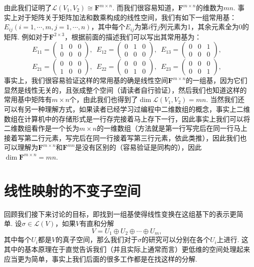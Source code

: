 由此我们证明了$\mathcal{L}(V_1,V_2)\cong\mathbf{F}^{m\times n}$. 而我们很容易知道，$\mathbf{F}^{m\times n}$的维数为$mn$. 事实上对于矩阵关于矩阵加法和数乘构成的线性空间，我们有如下一组常用基：$E_{ij}(i=1,\cdots,m,j=1,\cdots,n)$，其中每个$E_{ij}$为第$i$行$j$列元素为1，其余元素全为0的矩阵. 例如对于$\mathbf{F}^{2\times 3}$，根据前面的描述我们可以写出其常用基为：
\[E_{11}=\begin{pmatrix}
        1 & 0 & 0 \\
        0 & 0 & 0
    \end{pmatrix},\enspace E_{12}=\begin{pmatrix}
        0 & 1 & 0 \\
        0 & 0 & 0
    \end{pmatrix},\enspace E_{13}=\begin{pmatrix}
        0 & 0 & 1 \\
        0 & 0 & 0
    \end{pmatrix},\]
\[E_{21}=\begin{pmatrix}
        0 & 0 & 0 \\
        1 & 0 & 0
    \end{pmatrix},\enspace E_{22}=\begin{pmatrix}
        0 & 0 & 0 \\
        0 & 1 & 0
    \end{pmatrix},\enspace E_{23}=\begin{pmatrix}
        0 & 0 & 0 \\
        0 & 0 & 1
    \end{pmatrix},\]
事实上，我们很容易验证这样的常用基的确是线性空间$\mathbf{F}^{m\times n}$的一组基，因为它们显然是线性无关的，且张成整个空间（请读者自行验证），然后我们也知道这样的常用基中矩阵有$m\times n$个，由此我们也得到了$\dim\mathcal{L}(V_1,V_2)=mn$. 当然我们还可以有另一种理解方式，如果读者已经学习过编程中二维数组的概念，事实上二维数组在计算机中的存储形式是一行存完接着马上存下一行，因此事实上我们可以将二维数组看作是一个长为$m\times n$的一维数组（方法就是第一行写完后在同一行马上接着写第二行元素，写完后在同一行接着写第三行元素，依此类推），因此我们也可以理解为$\mathbf{F}^{m\times n}$和$\mathbf{F}^{mn}$是没有区别的（容易验证是同构的），因此$\dim\mathbf{F}^{m\times n}=mn$.

\section{线性映射的不变子空间}

回顾我们接下来讨论的目标，即找到一组基使得线性变换在这组基下的表示更简单. 设$\sigma\in\mathcal{L}(V)$，如果$V$有直和分解
\begin{equation}\label{eq:18:直和分解}
    V=U_1\oplus U_2\oplus\cdots\oplus U_m,
\end{equation}
其中每个$U_i$都是$V$的真子空间，那么我们对于$\sigma$的研究可以分别在各个$U_i$上进行. 这其中的基本原理在于直觉告诉我们（并且实际上通常而言）更低维的空间处理起来应当更为简单，事实上我们后面的很多工作都是在找这样的分解.


